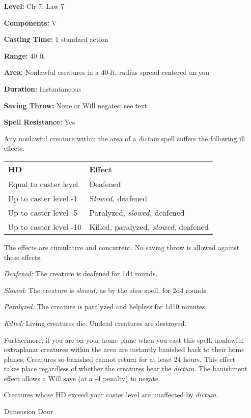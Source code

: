 \documentclass{article}
\begin{document}
\textbf{Level:} Clr 7, Law 7

\textbf{Components:} V

\textbf{Casting Time:} 1 standard action

\textbf{Range:} 40 ft.

\textbf{Area:} Nonlawful creatures in a 40-ft.-radius spread centered on you

\textbf{Duration:} Instantaneous

\textbf{Saving Throw:} None or Will negates; see text

\textbf{Spell Resistance:} Yes

Any nonlawful creature within the area of a \textit{dictum }spell suffers the following 
ill effects.

\begin{tabular}{|>{\raggedright}p{86pt}|>{\raggedright}p{141pt}|}
\hline
H\textbf{D} & E\textbf{ffect}\tabularnewline
\hline
Equal to caster level & Deafened\tabularnewline
\hline
Up to caster level -1 & S\textit{lowed, }deafened\tabularnewline
\hline
Up to caster level -5 & Paralyzed, \textit{slowed, }deafened\tabularnewline
\hline
Up to caster level -10 & Killed, paralyzed, \textit{slowed}, deafened\tabularnewline
\hline
\end{tabular}

The effects are cumulative and concurrent. No saving throw is allowed against these 
effects.

\textit{Deafened: }The creature is deafened for 1d4 rounds.

\textit{Slowed: }The creature is \textit{slowed, }as by the \textit{slow }spell, 
for 2d4 rounds.

\textit{Paralyzed: }The creature is paralyzed and helpless for 1d10 minutes.

\textit{Killed: }Living creatures die. Undead creatures are destroyed.

Furthermore, if you are on your home plane when you cast this spell, nonlawful 
extraplanar creatures within the area are instantly banished back to their home 
planes. Creatures so banished cannot return for at least 24 hours. This effect 
takes place regardless of whether the creatures hear the \textit{dictum. }The banishment 
effect allows a Will save (at a -4 penalty) to negate.

Creatures whose HD exceed your caster level are unaffected by \textit{dictum.}

\vspace{12pt}
Dimension Door
\end{document}
